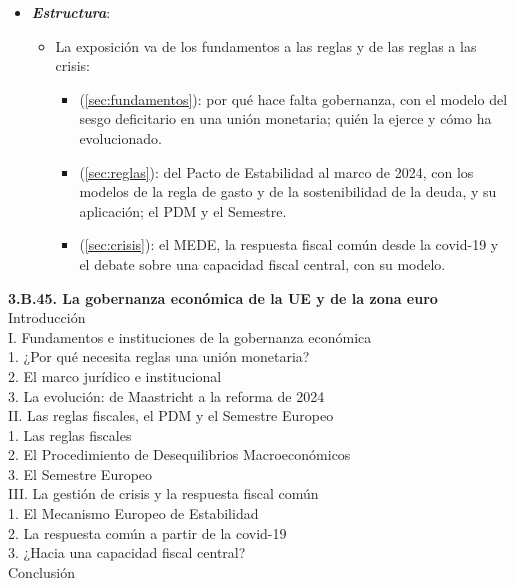 \documentclass[11pt]{article}
\begin{document}
\begin{itemize}
\item \textbf{\emph{Estructura}}:
  \begin{itemize}
  \item La exposición va de los fundamentos a las reglas y de las reglas a las crisis:
    \begin{itemize}
    \item {} (\ref{sec:fundamentos}): por qué hace falta gobernanza, con el modelo del sesgo deficitario en una unión monetaria; quién la ejerce y cómo ha evolucionado.
    \item {} (\ref{sec:reglas}): del Pacto de Estabilidad al marco de 2024, con los modelos de la regla de gasto y de la sostenibilidad de la deuda, y su aplicación; el PDM y el Semestre.
    \item {} (\ref{sec:crisis}): el MEDE, la respuesta fiscal común desde la covid-19 y el debate sobre una capacidad fiscal central, con su modelo.
    \end{itemize}
  \end{itemize}
\end{itemize}


\begin{esquema}[unbreakable]
\textbf{3.B.45. La gobernanza económica de la UE y de la zona euro}\\[2pt]
Introducción\\
I. Fundamentos e instituciones de la gobernanza económica\\
\hspace*{1.5em}1. ¿Por qué necesita reglas una unión monetaria?\\
\hspace*{1.5em}2. El marco jurídico e institucional\\
\hspace*{1.5em}3. La evolución: de Maastricht a la reforma de 2024\\
II. Las reglas fiscales, el PDM y el Semestre Europeo\\
\hspace*{1.5em}1. Las reglas fiscales\\
\hspace*{1.5em}2. El Procedimiento de Desequilibrios Macroeconómicos\\
\hspace*{1.5em}3. El Semestre Europeo\\
III. La gestión de crisis y la respuesta fiscal común\\
\hspace*{1.5em}1. El Mecanismo Europeo de Estabilidad\\
\hspace*{1.5em}2. La respuesta común a partir de la covid-19\\
\hspace*{1.5em}3. ¿Hacia una capacidad fiscal central?\\
Conclusión
\end{esquema}
\end{document}
